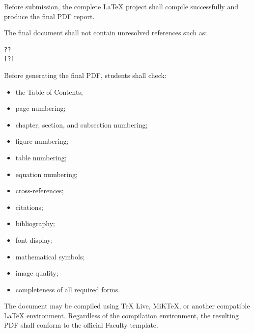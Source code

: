 {%

\noindent
{}

\vspace{0.15cm}

Before submission, the complete \LaTeX{} project shall compile
successfully and produce the final PDF report.

The final document shall not contain unresolved references such as:

\begin{verbatim}
??
[?]
\end{verbatim}

Before generating the final PDF, students shall check:

\begin{itemize}[leftmargin=0.8cm, itemsep=2pt]
    \item the Table of Contents;
    \item page numbering;
    \item chapter, section, and subsection numbering;
    \item figure numbering;
    \item table numbering;
    \item equation numbering;
    \item cross-references;
    \item citations;
    \item bibliography;
    \item font display;
    \item mathematical symbols;
    \item image quality;
    \item completeness of all required forms.
\end{itemize}

The document may be compiled using TeX Live, MiKTeX, or another
compatible \LaTeX{} environment. Regardless of the compilation
environment, the resulting PDF shall conform to the official Faculty
template.

\vspace{0.3cm}


\noindent
{}

}
